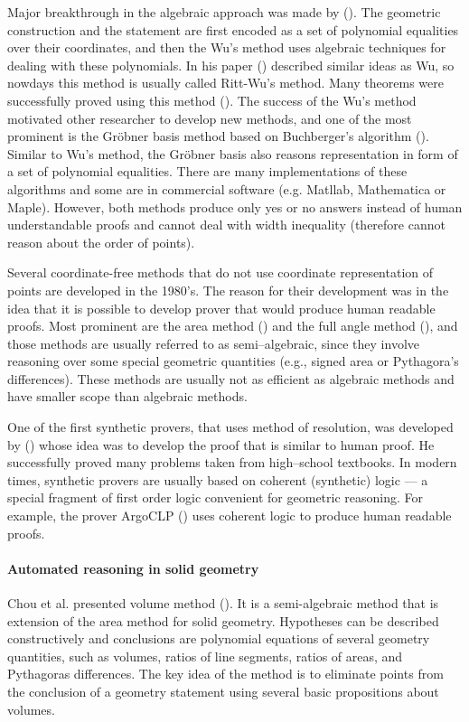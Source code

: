 \documentclass[final,1p,times,authoryear]{elsarticle}
\begin{document}
Major breakthrough in the algebraic approach was made by
(\cite{wu}). The geometric construction and the statement are first
encoded as a set of polynomial equalities over their coordinates, and
then the Wu's method uses algebraic techniques for dealing with these
polynomials. In his paper (\cite{ritt}) described similar ideas as Wu,
so nowdays this method is usually called Ritt-Wu's method. Many
theorems were successfully proved using this method
(\cite{chou1984}). The success of the Wu's method motivated other
researcher to develop new methods, and one of the most prominent is
the Gr\"obner basis method based on Buchberger's algorithm
(\cite{buchberger}). Similar to Wu's method, the Gr\"obner basis also
reasons representation in form of a set of polynomial
equalities. There are many implementations of these algorithms and
some are in commercial software (e.g. Matllab, Mathematica or
Maple). However, both methods produce only yes or no answers instead
of human understandable proofs and cannot deal with width inequality
(therefore cannot reason about the order of points).

Several coordinate-free methods that do not use coordinate
representation of points are developed in the 1980's. The reason for
their development was in the idea that it is possible to develop
prover that would produce human readable proofs. Most prominent are
the area method (\cite{area}) and the full angle method
(\cite{fullangle}), and those methods are usually referred to as
semi--algebraic, since they involve reasoning over some special
geometric quantities (e.g., signed area or Pythagora's
differences). These methods are usually not as efficient as algebraic
methods and have smaller scope than algebraic methods.

One of the first synthetic provers, that uses method of resolution,
was developed by (\cite{gelertner}) whose idea was to develop the
proof that is similar to human proof. He successfully proved many
problems taken from high--school textbooks. In modern times, synthetic
provers are usually based on coherent (synthetic) logic --- a special
fragment of first order logic convenient for geometric reasoning. For
example, the prover ArgoCLP (\cite{sana}) uses coherent logic to
produce human readable proofs.

\paragraph{Automated reasoning in solid geometry}
Chou et al. presented volume method (\cite{volumemethod}). It is a
semi-algebraic method that is extension of the area method for solid
geometry. Hypotheses can be described constructively and conclusions
are polynomial equations of several geometry quantities, such as
volumes, ratios of line segments, ratios of areas, and Pythagoras
differences. The key idea of the method is to eliminate points from
the conclusion of a geometry statement using several basic
propositions about volumes.
\end{document}
